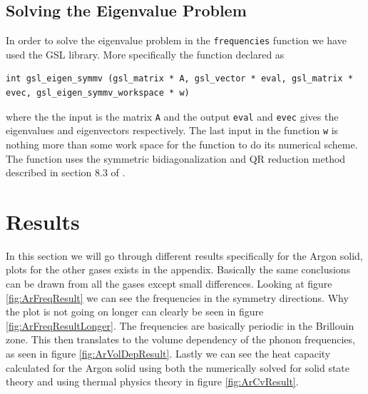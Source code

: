 \documentclass[11pt]{article}
\newlength\figureheight
\newlength\figurewidth
\newif\iftikz
\begin{document}
\subsection{Solving the Eigenvalue Problem}
In order to solve the eigenvalue problem in the \verb+frequencies+ function we have used the GSL library. More specifically the function declared as
\begin{lstlisting}
int gsl_eigen_symmv (gsl_matrix * A, gsl_vector * eval, gsl_matrix * evec, gsl_eigen_symmv_workspace * w)
\end{lstlisting}
where the the input is the matrix \verb+A+ and the output \verb+eval+ and \verb+evec+ gives the eigenvalues and eigenvectors respectively. The last input in the function \verb+w+ is nothing more than some work space for the function to do its numerical scheme. The function uses the symmetric bidiagonalization and QR reduction method described in section 8.3 of \cite{bib:num}.

\newpage
\section{Results}
In this section we will go through different results specifically for the Argon solid, plots for the other gases exists in the appendix. Basically the same conclusions can be drawn from all the gases except small differences. Looking at figure \ref{fig:ArFreqResult} we can see the frequencies in the symmetry directions. Why the plot is not going on longer can clearly be seen in figure \ref{fig:ArFreqResultLonger}. The frequencies are basically periodic in the Brillouin zone. This then translates to the volume dependency of the phonon frequencies, as seen in figure \ref{fig:ArVolDepResult}. Lastly we can see the heat capacity calculated for the Argon solid using both the numerically solved for solid state theory and using thermal physics theory in figure \ref{fig:ArCvResult}.
\iftikz
\begin{figure}[H]
	\centering
	\setlength\figureheight{4cm} 
	\setlength\figurewidth{15cm}
	
	\caption{Here we can see the phonon frequencies in the Argon solid from the middle of the first Brillouin zone to the middle of the second. All frequencies has been plotted (x,y and z) in each window. Due to sorting ascending frequency value we do not have the same color of all directions in the [110] direction.}
	\label{fig:ArFreqResult}
\end{figure}
\fi

\iftikz
\begin{figure}[H]
	\centering
	\setlength\figureheight{6cm} 
	\setlength\figurewidth{12cm}
	
	\caption{This picture highlights the periodicity of the frequency. The red vertical lines shows the boundary of the Brillouin zone and the cyan colored line shows the middle of the second Brillouin zone.}
	\label{fig:ArFreqResultLonger}
\end{figure}
\fi
\end{document}
